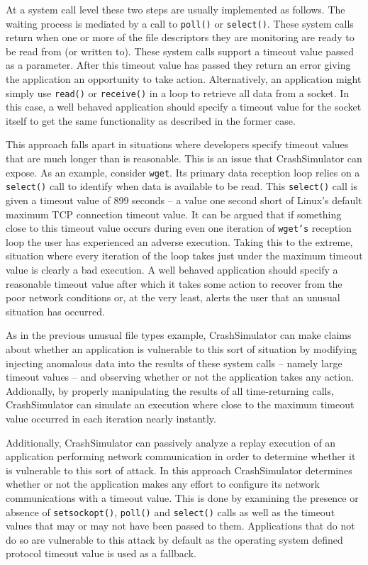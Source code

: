 At a system call level these two steps are usually implemented as follows.  The
waiting process is mediated by a call to {\tt poll()} or {\tt select()}.  These
system calls return when one or more of the file descriptors they are monitoring
are ready to be read from (or written to).  These system calls support a timeout
value passed as a parameter.  After this timeout value has passed they return an
error giving the application an opportunity to take action.  Alternatively, an
application might simply use {\tt read()} or {\tt receive()} in a loop to
retrieve all data from a socket.  In this case, a well behaved application
should specify a timeout value for the socket itself to get the same
functionality as described in the former case.

This approach falls apart in situations where developers specify timeout values
that are much longer than is reasonable.  This is an issue that CrashSimulator
can expose.  As an example, consider {\tt wget}.  Its primary data reception
loop relies on a {\tt select()} call to identify when data is available to be
read.  This {\tt select()} call is given a timeout value of 899 seconds -- a
value one second short of Linux's default maximum TCP connection timeout value.
It can be argued that if something close to this timeout value occurs during
even one iteration of {\tt wget's} reception loop the user has experienced an
adverse execution. Taking this to the extreme, situation where every iteration
of the loop takes just under the maximum timeout value is clearly a bad
execution.  A well behaved application should specify a reasonable timeout value
after which it takes some action to recover from the poor network conditions or,
at the very least, alerts the user that an unusual situation has occurred.

As in the previous unusual file types example, CrashSimulator can make claims
about whether an application is vulnerable to this sort of situation by
modifying injecting anomalous data into the results of these system calls --
namely large timeout values -- and observing whether or not the application
takes any action.  Addionally, by properly manipulating the results of all
time-returning calls, CrashSimulator can simulate an execution where close to
the maximum timeout value occurred in each iteration nearly instantly.

Additionally, CrashSimulator can passively analyze a replay execution of an
application performing network communication in order to determine whether it is
vulnerable to this sort of attack.  In this approach CrashSimulator determines
whether or not the application makes any effort to configure its network
communications with a timeout value. This is done by examining the presence or
absence of {\tt setsockopt()}, {\tt poll()} and {\tt select()} calls as well as
the timeout values that may or may not have been passed to them. Applications
that do not do so are vulnerable to this attack by default as the operating
system defined protocol timeout value is used as a fallback.

